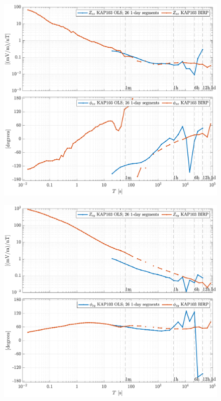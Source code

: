\documentclass{article}
\begin{document}
\begin{figure}[h!]
\centering
\includegraphics[width=\textwidth]{figures/KAP103/transferfnZ_compare-Z_xx_Magnitude_Phase.pdf}
\caption{}
\end{figure}

\clearpage

\begin{figure}[h!]
\centering
\includegraphics[width=\textwidth]{figures/KAP103/transferfnZ_compare-Z_xy_Magnitude_Phase.pdf}
\caption{}
\label{fig:universe}
\end{figure}
\end{document}

